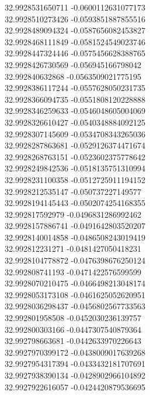 {32.9928531650711	-0.0600112631077173\\
32.9928510273426	-0.0593851887855516\\
32.9928489094324	-0.0587656082453827\\
32.9928468111849	-0.0581524549023746\\
32.9928447324446	-0.0575456628388765\\
32.9928426730569	-0.056945166798042\\
32.992840632868	-0.0563509021775195\\
32.9928386117244	-0.0557628050231735\\
32.9928366094735	-0.0551808120228888\\
32.9928346259633	-0.0546048605004069\\
32.9928326610427	-0.0540348884092125\\
32.9928307145609	-0.0534708343265036\\
32.9928287863681	-0.0529126374471674\\
32.9928268763151	-0.0523602375778642\\
32.9928249842536	-0.0518135751310994\\
32.9928231100358	-0.0512725911194152\\
32.9928212535147	-0.050737227149577\\
32.9928194145443	-0.0502074254168355\\
32.992817592979	-0.0496831286992462\\
32.9928157886741	-0.0491642803520207\\
32.9928140014858	-0.0486508243019419\\
32.992812231271	-0.0481427050418231\\
32.9928104778872	-0.0476398676250124\\
32.992808741193	-0.0471422576599599\\
32.9928070210475	-0.0466498213048174\\
32.9928053173108	-0.0461625052620951\\
32.9928036298437	-0.0456802567733563\\
32.992801958508	-0.0452030236139757\\
32.992800303166	-0.0447307540879364\\
32.992798663681	-0.0442633970226643\\
32.9927970399172	-0.0438009017639268\\
32.9927954317394	-0.0433432181707691\\
32.9927938390134	-0.0428902966104892\\
32.9927922616057	-0.0424420879536695\\
}
